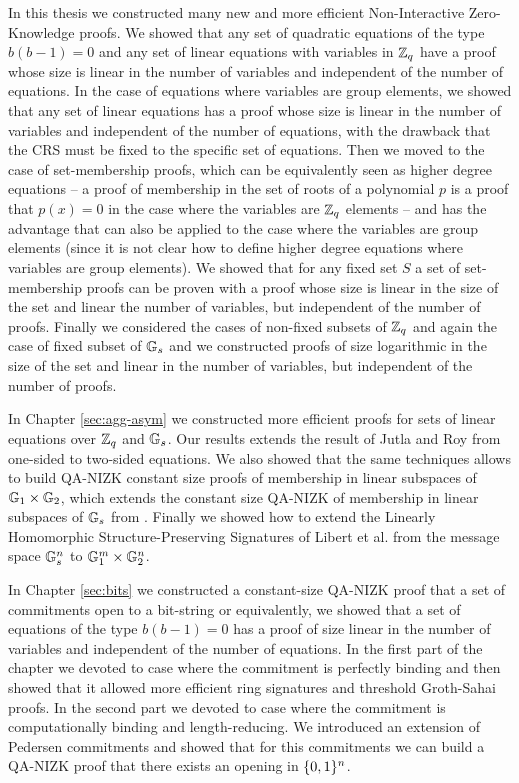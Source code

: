 In this thesis we constructed many new and more efficient Non-Interactive Zero-Knowledge proofs. We showed that any set of quadratic equations of the type $b(b-1)=0$ and any set of linear equations with variables in $\mathbb{Z}_q$ have a proof whose size is linear in the number of variables and independent of the number of equations. In the case of equations where variables are group elements, we showed that any set of linear equations has a proof whose size is linear in the number of variables and independent of the number of equations, with the drawback that the CRS must be fixed to the specific set of equations. Then we moved to the case of set-membership proofs, which can be equivalently seen as higher degree equations -- a proof of membership in the set of roots of a polynomial $p$ is a proof that $p(x)=0$ in the case where the variables are $\mathbb{Z}_q$ elements -- and has the advantage that can also be applied to the case where the variables are group elements (since it is not clear how to define higher degree equations where variables are group elements). We showed that for any fixed set $S$ a set of set-membership proofs can be proven with a proof whose size is linear in the size of the set and linear the number of variables, but independent of the number of proofs.
Finally we considered the cases of non-fixed subsets of $\mathbb{Z}_q$ and again the case of fixed subset of $\mathbb{G}_s$ and we constructed proofs of size logarithmic in the size of the set and linear in the number of variables, but independent of the number of proofs.

In Chapter \ref{sec:agg-asym} we constructed more efficient proofs for sets of linear equations over $\mathbb{Z}_q$ and $\mathbb{G}_s$. Our results extends the result of Jutla and Roy \cite{C:JutRoy14} from one-sided to two-sided equations. We also showed that the same techniques allows to build QA-NIZK constant size proofs of membership in linear subspaces of $\mathbb{G}_1\times\mathbb{G}_2$, which extends the constant size QA-NIZK of membership in linear subspaces of $\mathbb{G}_s$ from \cite{EC:LPJY14,C:JutRoy14,EC:KilWee15,EC:AbdBenPoi15}. Finally we showed how to extend the Linearly Homomorphic Structure-Preserving Signatures of Libert et al. \cite{EC:LPJY14} from the message space $\mathbb{G}_s^n$ to $\mathbb{G}_1^m\times\mathbb{G}_2^n$.

In Chapter \ref{sec:bits} we constructed a constant-size QA-NIZK proof that a set of commitments open to a bit-string or equivalently, we showed that a set of equations of the type $b(b-1)=0$ has a proof of size linear in the number of variables and independent of the number of equations. In the first part of the chapter we devoted to case where the commitment is perfectly binding and then showed that it allowed more efficient ring signatures and threshold Groth-Sahai proofs. In the second part we devoted to case where the commitment is computationally binding and length-reducing. We introduced an extension of Pedersen commitments and showed that for this commitments we can build a QA-NIZK proof that there exists an opening in $\{0,1\}^n$.

